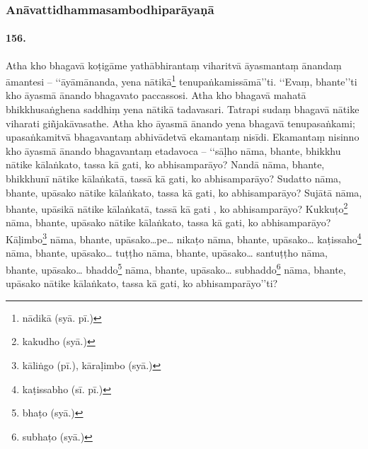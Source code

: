 \subsubsection{Anāvattidhammasambodhiparāyaṇā}

\paragraph{156.} Atha kho bhagavā koṭigāme yathābhirantaṃ viharitvā āyasmantaṃ ānandaṃ āmantesi – ‘‘āyāmānanda, yena nātikā\footnote{nādikā (syā. pī.)} tenupaṅkamissāmā’’ti. ‘‘Evaṃ, bhante’’ti kho āyasmā ānando bhagavato paccassosi. Atha kho bhagavā mahatā bhikkhusaṅghena saddhiṃ yena nātikā tadavasari. Tatrapi sudaṃ bhagavā nātike viharati giñjakāvasathe. Atha kho āyasmā ānando yena bhagavā tenupasaṅkami; upasaṅkamitvā bhagavantaṃ abhivādetvā ekamantaṃ nisīdi. Ekamantaṃ nisinno kho āyasmā ānando bhagavantaṃ etadavoca – ‘‘sāḷho nāma, bhante, bhikkhu nātike kālaṅkato, tassa kā gati, ko abhisamparāyo? Nandā nāma, bhante, bhikkhunī nātike kālaṅkatā, tassā kā gati, ko abhisamparāyo? Sudatto nāma, bhante, upāsako nātike kālaṅkato, tassa kā gati, ko abhisamparāyo? Sujātā nāma, bhante, upāsikā nātike kālaṅkatā, tassā kā gati , ko abhisamparāyo? Kukkuṭo\footnote{kakudho (syā.)} nāma, bhante, upāsako nātike kālaṅkato, tassa kā gati, ko abhisamparāyo? Kāḷimbo\footnote{kāliṅgo (pī.), kāraḷimbo (syā.)} nāma, bhante, upāsako…pe… nikaṭo nāma, bhante, upāsako… kaṭissaho\footnote{kaṭissabho (sī. pī.)} nāma, bhante, upāsako… tuṭṭho nāma, bhante, upāsako… santuṭṭho nāma, bhante, upāsako… bhaddo\footnote{bhaṭo (syā.)} nāma, bhante, upāsako… subhaddo\footnote{subhaṭo (syā.)} nāma, bhante, upāsako nātike kālaṅkato, tassa kā gati, ko abhisamparāyo’’ti?

